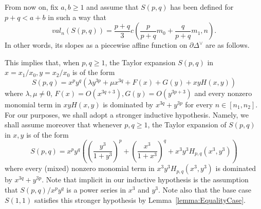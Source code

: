 \documentclass{article}
\begin{document}
From now on, fix $a,b\geq 1$ and assume that  $S(p,q)$ has been defined for $p+q<a+b$ in such a way that 
\[
val_n(S(p,q)) = \frac{p+q}{3}c(\frac{p}{p+q}m_0+\frac{q}{p+q}m_1,n).
\]
In other words, its slopes as a piecewise affine function on $\partial\Delta^\vee$ are as follows.
\begin{center}
\end{center}

This implies that, when $p,q\geq 1$, the Taylor expansion $S(p,q)$ in $x=x_1/x_0,y=x_2/x_0$ is of the form 
\[
S(p,q) = x^py^q(\lambda y^{3p}+\mu x^{3q}+ F(x) + G(y) + xy H(x,y))
\]
where $\lambda,\mu\neq 0$, $F(x) = O(x^{3q+3}), G(y)=O(y^{3p+3})$ and every nonzero monomial term in $xyH(x,y)$ is dominated by $x^{3q}+y^{3p}$ for every $n\in[n_1,n_2]$. For our purposes, we shall adopt a stronger inductive hypothesis. Namely, we shall assume moreover that whenever $p,q\geq 1$, the Taylor expansion of $S(p,q)$ in $x,y$ is of the form
\begin{equation}\label{eqn:CorrectTaylorSeries}
    S(p,q) = x^py^q\left(\left(\frac{y^3}{1+y^3}\right)^p + \left(\frac{x^3}{1+x^3}\right)^q + x^3y^3H_{p,q}(x^3,y^3)\right)
\end{equation}
where every (mixed) nonzero monomial term in $x^3y^3H_{p,q}(x^3,y^3)$ is dominated by $x^{3q}+y^{3p}$. Note that implicit in our inductive hypothesis is the assumption that $S(p,q)/x^py^q$ is a power series in $x^3$ and $y^3$. Note also that the base case $S(1,1)$ satisfies this stronger hypothesis by Lemma~\ref{lemma:EqualityCase}. 
\end{document}
